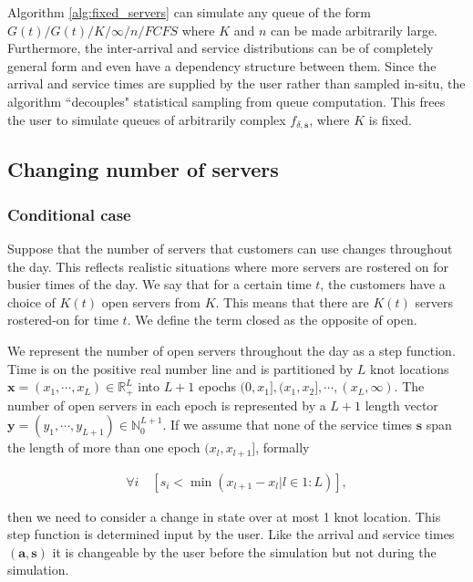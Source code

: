 \documentclass[article]{jss}
\begin{document}
Algorithm \ref{alg:fixed_servers} can simulate any queue of the form $G(t)/G(t)/K/\infty/n/FCFS$ where $K$ and $n$ can be made arbitrarily large. Furthermore, the inter-arrival and service distributions can be of completely general form and even have a dependency structure between them. Since the arrival and service times are supplied by the user rather than sampled in-situ, the algorithm ``decouples" statistical sampling from queue computation. This frees the user to simulate queues of arbitrarily complex $f_{\delta, \mathbf{s}}$, where $K$ is fixed. 

\subsection{Changing number of servers}

\subsubsection{Conditional case}

Suppose that the number of servers that customers can use changes throughout the day. This reflects realistic situations where more servers are rostered on for busier times of the day. We say that for a certain time $t$, the customers have a choice of $K(t)$ open servers from $K$. This means that there are $K(t)$ servers rostered-on for time $t$. We define the term closed as the opposite of open. 

We represent the number of open servers throughout the day as a step function. Time is on the positive real number line and is partitioned by $L$ knot locations $\mathbf{x} = (x_1, \cdots, x_L ) \in \mathbb{R}^L_{+}$ into $L+1$ epochs $(0, x_1], (x_1, x_2], \cdots, (x_L, \infty)$. The number of open servers in each epoch is represented by a $L+1$ length vector $\mathbf{y} = (y_1, \cdots, y_{L+1} ) \in \mathbb{N}^{L+1}_0$. If we assume that none of the service times $\mathbf{s}$ span the length of more than one epoch $(x_{l}, x_{l+1}]$, formally

\begin{align}
\forall i \quad \left[ s_i < \min({ x_{l+1} - x_{l} | l \in 1:L }) \right] \label{eq:condition},
\end{align}

then we need to consider a change in state over at most 1 knot location. This step function is determined input by the user. Like the arrival and service times $\mathbf{(a,s)}$ it is changeable by the user before the simulation but not during the simulation. 
\end{document}
